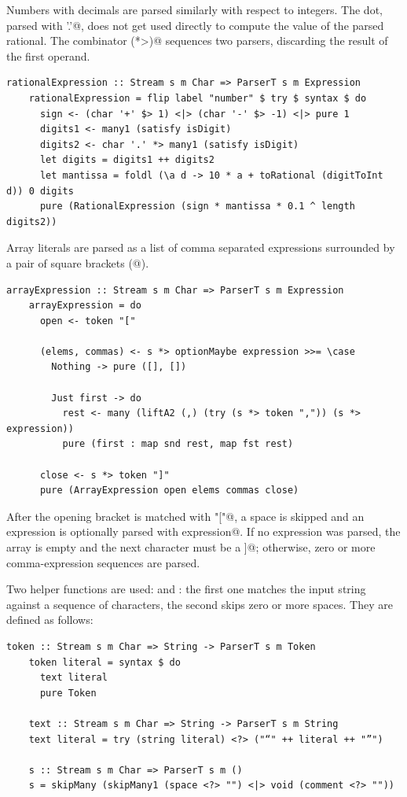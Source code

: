 \documentclass[UdineBachThesis,american,11pt]{PhdThesis}
\begin{document}
  Numbers with decimals are parsed similarly with respect to integers. The dot,
  parsed with \lstinline@char '.'@, does not get used directly to compute the
  value of the parsed rational. The combinator \lstinline@(*>)@ sequences two
  parsers, discarding the result of the first operand.

  \begin{lstlisting}[gobble=4,basicstyle=\ttfamily\small]
    rationalExpression :: Stream s m Char => ParserT s m Expression
    rationalExpression = flip label "number" $ try $ syntax $ do
      sign <- (char '+' $> 1) <|> (char '-' $> -1) <|> pure 1
      digits1 <- many1 (satisfy isDigit)
      digits2 <- char '.' *> many1 (satisfy isDigit)
      let digits = digits1 ++ digits2
      let mantissa = foldl (\a d -> 10 * a + toRational (digitToInt d)) 0 digits
      pure (RationalExpression (sign * mantissa * 0.1 ^ length digits2))
  \end{lstlisting}

  Array literals are parsed as a list of comma separated expressions surrounded
  by a pair of square brackets (\lstinline@[@, \lstinline@]@).

  \begin{lstlisting}[gobble=4,basicstyle=\ttfamily\small]
    arrayExpression :: Stream s m Char => ParserT s m Expression
    arrayExpression = do
      open <- token "["

      (elems, commas) <- s *> optionMaybe expression >>= \case
        Nothing -> pure ([], [])

        Just first -> do
          rest <- many (liftA2 (,) (try (s *> token ",")) (s *> expression))
          pure (first : map snd rest, map fst rest)

      close <- s *> token "]"
      pure (ArrayExpression open elems commas close)
  \end{lstlisting}

  After the opening bracket is matched with \lstinline@token "["@, a space is
  skipped and an expression is optionally parsed with
  \lstinline@optionMaybe expression@. If no expression was parsed, the array
  is empty and the next character must be a \lstinline@]@; otherwise, zero or
  more comma-expression sequences are parsed.

  Two helper functions are used: \lstinline@token@ and \lstinline@s@: the first
  one matches the input string against a sequence of characters, the second
  skips zero or more spaces. They are defined as follows:

  \begin{lstlisting}[gobble=4,basicstyle=\ttfamily\small]
    token :: Stream s m Char => String -> ParserT s m Token
    token literal = syntax $ do
      text literal
      pure Token

    text :: Stream s m Char => String -> ParserT s m String
    text literal = try (string literal) <?> ("“" ++ literal ++ "”")

    s :: Stream s m Char => ParserT s m ()
    s = skipMany (skipMany1 (space <?> "") <|> void (comment <?> ""))
  \end{lstlisting}
\end{document}
